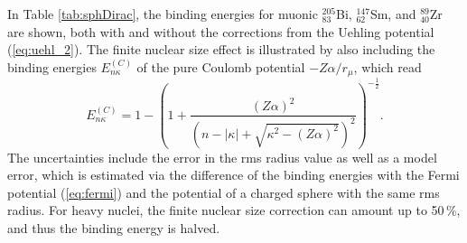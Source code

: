 In Table \ref{tab:sphDirac}, the binding energies for muonic $^{205}_{83}$Bi, $^{147}_{62}$Sm, and $^{89}_{40}$Zr are shown, both with and without the corrections from the Uehling potential (\ref{eq:uehl_2}). The finite nuclear size effect is illustrated by also including the binding energies $E^{(C)}_{n\kappa}$ of the pure Coulomb potential $-Z\alpha / r_\mu$, which read \cite{greiner2000}
\begin{equation}
\label{eq:finestructure_formula_2}
E^{(C)}_{n\kappa}=1-\left(1+\frac{(Z\alpha)^2}{\left( n-|\kappa|+\sqrt{\kappa^2-(Z\alpha)^2} \right)^2}\right)^{-\frac{1}{2}}.
\end{equation}
The uncertainties include the error in the rms radius value as well as a model error, which is estimated via the difference of the binding energies with the Fermi potential (\ref{eq:fermi}) and the potential of a charged sphere with the same rms radius. For heavy nuclei, the finite nuclear size correction can amount up to 50$\,\%$, and thus the binding energy is halved.

